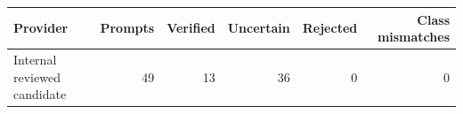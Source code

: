 \begin{tabular}{lrrrrr}
\toprule
Provider & Prompts & Verified & Uncertain & Rejected & Class mismatches \\
\midrule
Internal reviewed candidate & 49 & 13 & 36 & 0 & 0 \\
\bottomrule
\end{tabular}
